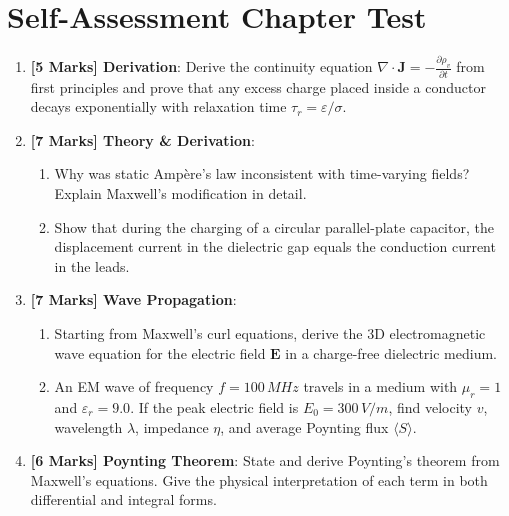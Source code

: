 \section{Self-Assessment Chapter Test}

\begin{chaptertest}
\begin{enumerate}
    \item \textbf{[5 Marks] Derivation}: Derive the continuity equation $\nabla \cdot \mathbf{J} = -\frac{\partial \rho_v}{\partial t}$ from first principles and prove that any excess charge placed inside a conductor decays exponentially with relaxation time $\tau_r = \varepsilon/\sigma$.
    
    \item \textbf{[7 Marks] Theory \& Derivation}:
    \begin{enumerate}
        \item Why was static Ampère's law inconsistent with time-varying fields? Explain Maxwell's modification in detail.
        \item Show that during the charging of a circular parallel-plate capacitor, the displacement current in the dielectric gap equals the conduction current in the leads.
    \end{enumerate}
    
    \item \textbf{[7 Marks] Wave Propagation}:
    \begin{enumerate}
        \item Starting from Maxwell's curl equations, derive the 3D electromagnetic wave equation for the electric field $\mathbf{E}$ in a charge-free dielectric medium.
        \item An EM wave of frequency $f = 100\,\si{MHz}$ travels in a medium with $\mu_r = 1$ and $\varepsilon_r = 9.0$. If the peak electric field is $E_0 = 300\,\si{V/m}$, find velocity $v$, wavelength $\lambda$, impedance $\eta$, and average Poynting flux $\langle S \rangle$.
    \end{enumerate}
    
    \item \textbf{[6 Marks] Poynting Theorem}: State and derive Poynting's theorem from Maxwell's equations. Give the physical interpretation of each term in both differential and integral forms.
\end{enumerate}
\end{chaptertest}

